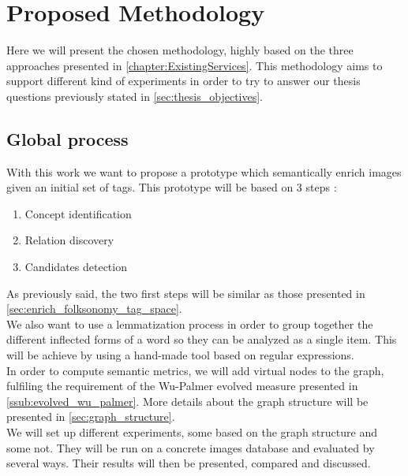 
\chapter{Proposed Methodology} %

\label{chapter:Methodology} %


Here we will present the chosen methodology, highly based on the three approaches presented in \ref{chapter:ExistingServices}. This methodology aims to support different kind of experiments in order to try to answer our thesis questions previously stated in \ref{sec:thesis_objectives}. 

\section{Global process} %
\label{sec:global_process}
With this work we want to propose a prototype which semantically enrich images given an initial set of tags. This prototype will be based on 3 steps :
\begin{enumerate}
	\item Concept identification
	\item Relation discovery
	\item Candidates detection
\end{enumerate}
As previously said, the two first steps will be similar as those presented in \ref{sec:enrich_folksonomy_tag_space}. \\

We also want to use a lemmatization process in order to group together the different inflected forms of a word so they can be analyzed as a single item. This will be achieve by using a hand-made tool based on regular expressions.\\

In order to compute semantic metrics, we will add virtual nodes to the graph, fulfiling the requirement of the Wu-Palmer evolved measure presented in \ref{ssub:evolved_wu_palmer}. More details about the graph structure will be presented in \ref{sec:graph_structure}.\\

We will set up different experiments, some based on the graph structure and some not. They will be run on a concrete images database and evaluated by several ways. Their results will then be presented, compared and discussed.
